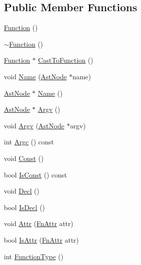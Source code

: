 \subsection*{Public Member Functions}
\begin{DoxyCompactItemize}
\item 
\hyperlink{classmocha_1_1_function_a91051b21b9ab3cf0a7076ac1c8f19d12}{Function} ()
\item 
\hyperlink{classmocha_1_1_function_acfd060d663bcb7aba9b404b97f21bef3}{$\sim$Function} ()
\item 
\hyperlink{classmocha_1_1_function}{Function} $\ast$ \hyperlink{classmocha_1_1_function_a7054a10d92311750a4a2e1ce9a36f3d3}{CastToFunction} ()
\item 
void \hyperlink{classmocha_1_1_function_a519eeb5120164a9a77734db8c0de3ca8}{Name} (\hyperlink{classmocha_1_1_ast_node}{AstNode} $\ast$name)
\item 
\hyperlink{classmocha_1_1_ast_node}{AstNode} $\ast$ \hyperlink{classmocha_1_1_function_a11f15ec2f685a424ca93ac66faae2e6f}{Name} ()
\item 
\hyperlink{classmocha_1_1_ast_node}{AstNode} $\ast$ \hyperlink{classmocha_1_1_function_ad46af100a0740ba509a4ce4564bd912b}{Argv} ()
\item 
void \hyperlink{classmocha_1_1_function_a70f7f55e89c7d0e9e3c241c81f5647af}{Argv} (\hyperlink{classmocha_1_1_ast_node}{AstNode} $\ast$argv)
\item 
int \hyperlink{classmocha_1_1_function_a0fc7801db6782d941286b65cf3a6e2d0}{Argc} () const 
\item 
void \hyperlink{classmocha_1_1_function_aa8d43f0d016e1349a99a51e3cb6cde41}{Const} ()
\item 
bool \hyperlink{classmocha_1_1_function_a84c41c96c4a3e0da3ad764725e612edf}{IsConst} () const 
\item 
void \hyperlink{classmocha_1_1_function_a73f2d87ec7fc1930ee98948ee2fb9bca}{Decl} ()
\item 
bool \hyperlink{classmocha_1_1_function_a9e94abc1b5b8b0b986ef55c4a2883dad}{IsDecl} ()
\item 
void \hyperlink{classmocha_1_1_function_a77b9a126d99d66e9ca154056af9613ba}{Attr} (\hyperlink{classmocha_1_1_function_a73818727e95b7e36aa1b57c65a0a596d}{FnAttr} attr)
\item 
bool \hyperlink{classmocha_1_1_function_ae49decbf4b4e689312b0e1c824e264da}{IsAttr} (\hyperlink{classmocha_1_1_function_a73818727e95b7e36aa1b57c65a0a596d}{FnAttr} attr)
\item 
int \hyperlink{classmocha_1_1_function_a3da8c03271c7f64db13da13e53c5f6cb}{FunctionType} ()

\end{DoxyCompactItemize}

